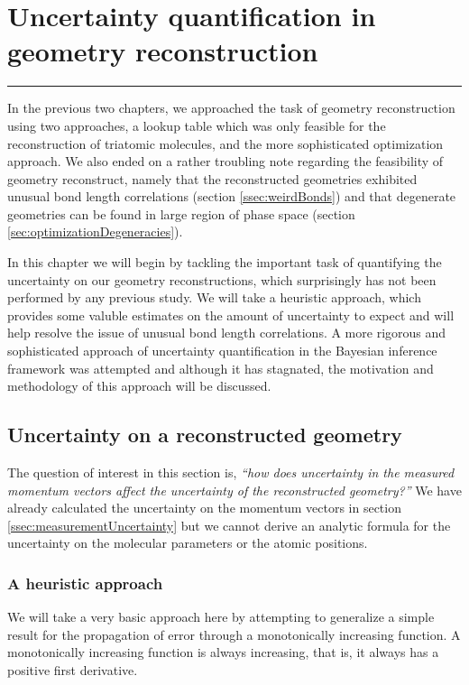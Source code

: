 \chapter{Uncertainty quantification in geometry reconstruction} \label{ch:uncertainty}

\vspace{-1.5 em}
\begin{addmargin}[-0.5cm]{0cm}
  \minitoc
\end{addmargin}
\hrule
\vspace{1.5 em}

In the previous two chapters, we approached the task of geometry reconstruction using two approaches, a lookup table which was only feasible for the reconstruction of triatomic molecules, and the more sophisticated optimization approach. We also ended on a rather troubling note regarding the feasibility of geometry reconstruct, namely that the reconstructed geometries exhibited unusual bond length correlations (section \ref{ssec:weirdBonds}) and that degenerate geometries can be found in large region of phase space (section \ref{sec:optimizationDegeneracies}).

In this chapter we will begin by tackling the important task of quantifying the uncertainty on our geometry reconstructions, which surprisingly has not been performed by any previous study. We will take a heuristic approach, which provides some valuble estimates on the amount of uncertainty to expect and will help resolve the issue of unusual bond length correlations. A more rigorous and sophisticated approach of uncertainty quantification in the Bayesian inference framework was attempted and although it has stagnated, the motivation and methodology of this approach will be discussed.

\section{Uncertainty on a reconstructed geometry} \label{sec:heuristicApproach}
The question of interest in this section is, \textit{``how does uncertainty in the measured momentum vectors affect the uncertainty of the reconstructed geometry?''} We have already calculated the uncertainty on the momentum vectors in section \ref{ssec:measurementUncertainty} but we cannot derive an analytic formula for the uncertainty on the molecular parameters or the atomic positions.

\subsection{A heuristic approach}
We will take a very basic approach here by attempting to generalize a simple result for the propagation of error through a monotonically increasing function. A monotonically increasing function is always increasing, that is, it always has a positive first derivative.

